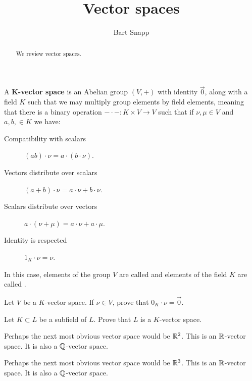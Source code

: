 \documentclass{ximera}
\author{Bart Snapp}
\title{Vector spaces}
\begin{document}
\begin{abstract}
  We review vector spaces.
\end{abstract}
\maketitle



\begin{definition}
  A \textbf{$\boldsymbol{K}$-vector space} is an Abelian group $(V,+)$
  with identity $\vec{0}$, along with a field $K$ such that we may
  multiply group elements by field elements, meaning that there is a
  binary operation $-\cdot-: K\times V \to V$ such that if $\nu,\mu\in
  V$ and $a,b,\in K$ we have:
\begin{description}
\item[Compatibility with scalars] $(ab)\cdot \nu = a\cdot (b\cdot \nu)$.
\item[Vectors distribute over scalars] $(a+b)\cdot \nu =
  a\cdot\nu + b\cdot \nu$.
\item[Scalars distribute over vectors] $a\cdot (\nu+\mu) =
  a\cdot \nu + a\cdot \mu$.
\item[Identity is respected] $1_K\cdot \nu = \nu$.
\end{description}
In this case, elements of the group $V$ are called  and
elements of the field $K$ are called .
\end{definition}


\begin{exercise}
  Let $V$ be a $K$-vector space. If $\nu\in V$, prove that
  $0_K\cdot \nu = \vec{0}$.
\end{exercise}


\begin{exercise}\label{E:sfvs}
  Let $K\subset L$ be a subfield of $L$. Prove that $L$ is a
  $K$-vector space.
\end{exercise}


\begin{example}
  Perhaps the next most obvious vector space would be $\mathbb R^2$. This is
  an $\mathbb R$-vector space. It is also a $\mathbb Q$-vector space.
\end{example}



\begin{example}
  Perhaps the next most obvious vector space would be $\mathbb R^3$. This is
  an $\mathbb R$-vector space. It is also a $\mathbb Q$-vector space.
\end{example}
\end{document}
